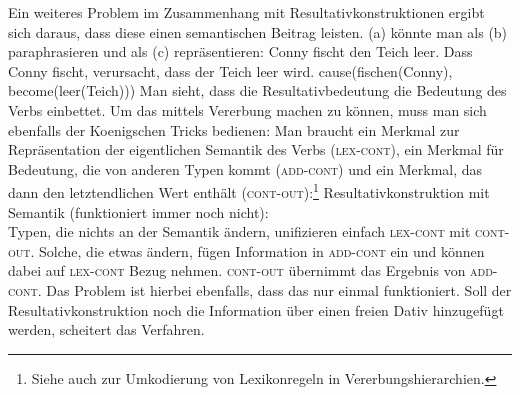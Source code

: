 Ein weiteres Problem im Zusammenhang mit Resultativkonstruktionen ergibt sich daraus, dass
diese einen semantischen Beitrag leisten. (a) könnte man als (b) paraphrasieren
und als (c) repräsentieren:
\newpage
\eal
\ex Conny fischt den Teich leer.
\ex Dass Conny fischt, verursacht, dass der Teich leer wird.
\ex cause(fischen(Conny), become(leer(Teich)))
\zl
Man sieht, dass die Resultativbedeutung die Bedeutung des Verbs einbettet. Um das mittels Vererbung
machen zu können, muss man sich ebenfalls der Koenigschen Tricks bedienen: Man braucht ein Merkmal
zur Repräsentation der eigentlichen Semantik des Verbs (\textsc{lex-cont}), ein Merkmal für
Bedeutung, die von anderen Typen kommt (\textsc{add-cont}) und ein Merkmal, das dann den letztendlichen
Wert enthält (\textsc{cont-out}):\footnote{
  Siehe auch  zur Umkodierung von Lexikonregeln in Vererbungshierarchien.
}
\ea
Resultativkonstruktion mit Semantik (funktioniert immer noch nicht):\\
\z
Typen, die nichts an der Semantik ändern, unifizieren einfach \textsc{lex-cont} mit \textsc{cont-out}.
Solche, die etwas ändern, fügen Information in \textsc{add-cont} ein und können dabei auf \textsc{lex-cont}
Bezug nehmen. \textsc{cont-out} übernimmt das Ergebnis von \textsc{add-cont}. Das Problem ist hierbei ebenfalls,
dass das nur einmal funktioniert. Soll der Resultativkonstruktion noch die Information über einen
freien Dativ hinzugefügt werden, scheitert das Verfahren.


